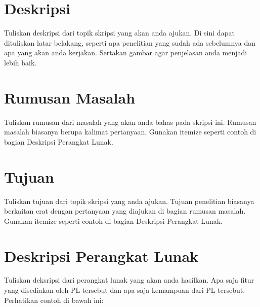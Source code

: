 \documentclass[a4paper,twoside]{article}
\begin{document}
\title{\@judultopik}
\author{\nama \textendash \@npm} 

\newcommand{\nama}{Lionov}
\newcommand{\@npm}{1997730020}
\newcommand{\@judultopik}{Median Trajectory} %
\newcommand{\jumpemb}{1} %
\newcommand{\tanggal}{01/01/1900}
\maketitle


\section{Deskripsi}
Tuliskan deskripsi dari topik skripsi yang akan anda ajukan. Di sini dapat dituliskan latar belakang, seperti apa penelitian yang sudah ada sebelumnya dan apa yang akan anda kerjakan. Sertakan gambar agar penjelasan anda menjadi lebih baik.

\lipsum[1] %

\section{Rumusan Masalah}
Tuliskan rumusan dari masalah yang akan anda bahas pada skripsi ini. Rumusan masalah biasanya berupa kalimat pertanyaan. Gunakan itemize seperti contoh di bagian Deskripsi Perangkat Lunak.

\section{Tujuan}
Tuliskan tujuan dari topik skripsi yang anda ajukan. Tujuan penelitian biasanya berkaitan erat dengan pertanyaan yang diajukan di bagian rumusan masalah. Gunakan itemize seperti contoh di bagian Deskripsi Perangkat Lunak.

\section{Deskripsi Perangkat Lunak}
Tuliskan deksripsi dari perangkat lunak yang akan anda hasilkan. Apa saja fitur yang disediakan oleh PL tersebut dan apa saja kemampuan dari PL tersebut. Perhatikan contoh di bawah ini:
\end{document}
